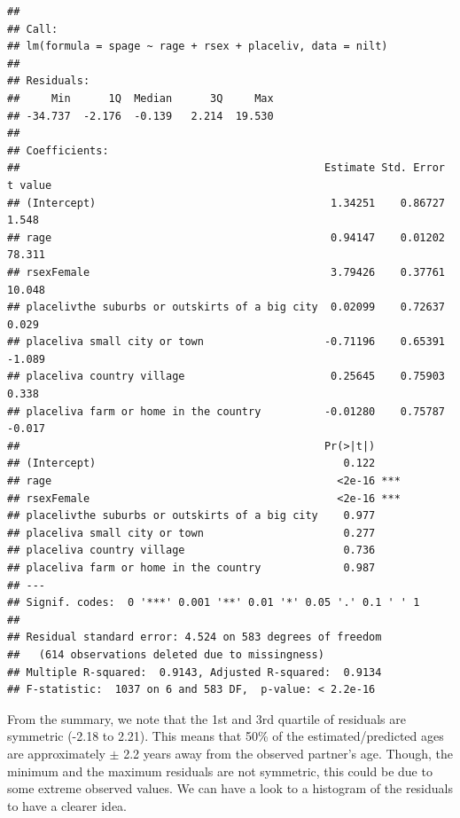 \documentclass[
]{book}
\newenvironment{Shaded}{\begin{snugshade}}{\end{snugshade}}
\newcommand{\FunctionTok}[1]{\textcolor[rgb]{0.13,0.29,0.53}{\textbf{#1}}}
\newcommand{\NormalTok}[1]{#1}
\newcommand{\SpecialCharTok}[1]{\textcolor[rgb]{0.81,0.36,0.00}{\textbf{#1}}}
\begin{document}
\begin{verbatim}
## 
## Call:
## lm(formula = spage ~ rage + rsex + placeliv, data = nilt)
## 
## Residuals:
##     Min      1Q  Median      3Q     Max 
## -34.737  -2.176  -0.139   2.214  19.530 
## 
## Coefficients:
##                                                Estimate Std. Error t value
## (Intercept)                                     1.34251    0.86727   1.548
## rage                                            0.94147    0.01202  78.311
## rsexFemale                                      3.79426    0.37761  10.048
## placelivthe suburbs or outskirts of a big city  0.02099    0.72637   0.029
## placeliva small city or town                   -0.71196    0.65391  -1.089
## placeliva country village                       0.25645    0.75903   0.338
## placeliva farm or home in the country          -0.01280    0.75787  -0.017
##                                                Pr(>|t|)    
## (Intercept)                                       0.122    
## rage                                             <2e-16 ***
## rsexFemale                                       <2e-16 ***
## placelivthe suburbs or outskirts of a big city    0.977    
## placeliva small city or town                      0.277    
## placeliva country village                         0.736    
## placeliva farm or home in the country             0.987    
## ---
## Signif. codes:  0 '***' 0.001 '**' 0.01 '*' 0.05 '.' 0.1 ' ' 1
## 
## Residual standard error: 4.524 on 583 degrees of freedom
##   (614 observations deleted due to missingness)
## Multiple R-squared:  0.9143, Adjusted R-squared:  0.9134 
## F-statistic:  1037 on 6 and 583 DF,  p-value: < 2.2e-16
\end{verbatim}

From the summary, we note that the 1st and 3rd quartile of residuals are symmetric (-2.18 to 2.21). This means that 50\% of the estimated/predicted ages are approximately \(\pm\) 2.2 years away from the observed partner's age. Though, the minimum and the maximum residuals are not symmetric, this could be due to some extreme observed values. We can have a look to a histogram of the residuals to have a clearer idea.

\begin{Shaded}
\end{Shaded}
\end{document}
